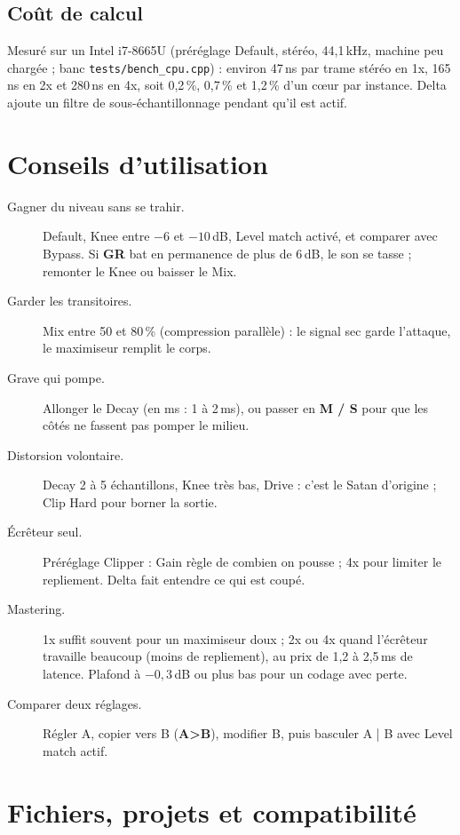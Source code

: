 \documentclass[a4paper,11pt]{article}
\newcommand{\ctl}[1]{\textsf{\textbf{#1}}}   %
\newcommand{\dB}{\,dB}
\begin{document}
\subsection{Coût de calcul}
Mesuré sur un Intel i7-8665U (préréglage Default, stéréo, 44,1\,kHz, machine peu chargée ;
banc \texttt{tests/bench\_cpu.cpp}) : environ 47\,ns par trame stéréo en 1x, 165\,ns en 2x et
280\,ns en 4x, soit 0,2\,\%, 0,7\,\% et 1,2\,\% d'un cœur par instance. Delta ajoute un filtre de
sous-échantillonnage pendant qu'il est actif.

\section{Conseils d'utilisation}

\begin{description}
\item[Gagner du niveau sans se trahir.] Default, Knee entre $-6$ et $-10$\dB, Level match
  activé, et comparer avec Bypass. Si \ctl{GR} bat en permanence de plus de 6\dB, le son se
  tasse ; remonter le Knee ou baisser le Mix.
\item[Garder les transitoires.] Mix entre 50 et 80\,\% (compression parallèle) : le signal sec
  garde l'attaque, le maximiseur remplit le corps.
\item[Grave qui pompe.] Allonger le Decay (en ms : 1 à 2\,ms), ou passer en \ctl{M / S} pour que
  les côtés ne fassent pas pomper le milieu.
\item[Distorsion volontaire.] Decay 2 à 5 échantillons, Knee très bas, Drive : c'est le
  \og Satan\fg{} d'origine ; Clip Hard pour borner la sortie.
\item[Écrêteur seul.] Préréglage Clipper : Gain règle de combien on pousse ; 4x pour limiter le
  repliement. Delta fait entendre ce qui est coupé.
\item[Mastering.] 1x suffit souvent pour un maximiseur doux ; 2x ou 4x quand l'écrêteur
  travaille beaucoup (moins de repliement), au prix de 1,2 à 2,5\,ms de latence. Plafond à $-0{,}3$\dB{} ou plus bas
  pour un codage avec perte.
\item[Comparer deux réglages.] Régler A, copier vers B (\ctl{A>B}), modifier B, puis basculer A
  | B avec Level match actif.
\end{description}

\section{Fichiers, projets et compatibilité}\label{sec:fichiers}
\end{document}
